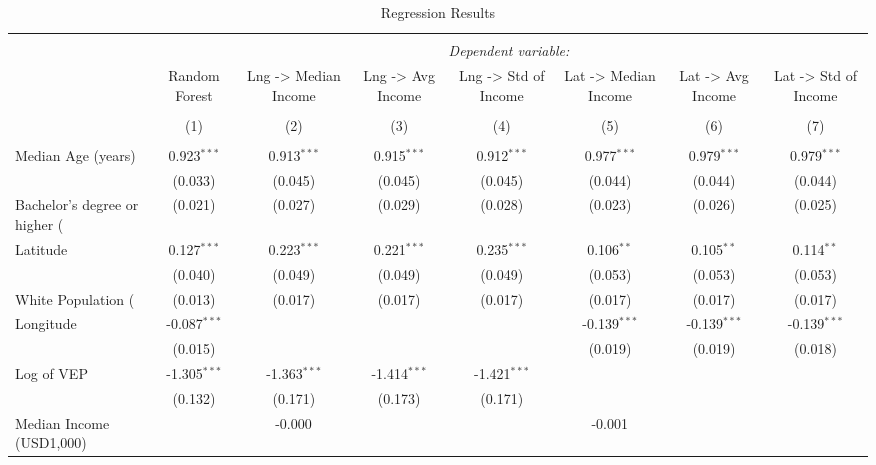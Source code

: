 \begin{table}[!htbp] \centering
  \caption{Regression Results}
\begin{tabular}{@{\extracolsep{5pt}}lccccccc}
\\[-1.8ex]\hline
\hline \\[-1.8ex]
& \multicolumn{7}{c}{\textit{Dependent variable:}} \
\cr \cline{7-8}
\\[-1.8ex] & \multicolumn{1}{c}{Random Forest} & \multicolumn{1}{c}{Lng -> Median Income} & \multicolumn{1}{c}{Lng -> Avg Income} & \multicolumn{1}{c}{Lng -> Std of Income} & \multicolumn{1}{c}{Lat -> Median Income} & \multicolumn{1}{c}{Lat -> Avg Income} & \multicolumn{1}{c}{Lat -> Std of Income}  \\
\\[-1.8ex] & (1) & (2) & (3) & (4) & (5) & (6) & (7) \\
\hline \\[-1.8ex]
 Median Age (years) & 0.923$^{***}$ & 0.913$^{***}$ & 0.915$^{***}$ & 0.912$^{***}$ & 0.977$^{***}$ & 0.979$^{***}$ & 0.979$^{***}$ \\
  & (0.033) & (0.045) & (0.045) & (0.045) & (0.044) & (0.044) & (0.044) \\
 Bachelor's degree or higher (%
  & (0.021) & (0.027) & (0.029) & (0.028) & (0.023) & (0.026) & (0.025) \\
 Latitude & 0.127$^{***}$ & 0.223$^{***}$ & 0.221$^{***}$ & 0.235$^{***}$ & 0.106$^{**}$ & 0.105$^{**}$ & 0.114$^{**}$ \\
  & (0.040) & (0.049) & (0.049) & (0.049) & (0.053) & (0.053) & (0.053) \\
 White Population (%
  & (0.013) & (0.017) & (0.017) & (0.017) & (0.017) & (0.017) & (0.017) \\
 Longitude & -0.087$^{***}$ & & & & -0.139$^{***}$ & -0.139$^{***}$ & -0.139$^{***}$ \\
  & (0.015) & & & & (0.019) & (0.019) & (0.018) \\
 Log of VEP & -1.305$^{***}$ & -1.363$^{***}$ & -1.414$^{***}$ & -1.421$^{***}$ & & & \\
  & (0.132) & (0.171) & (0.173) & (0.171) & & & \\
 Median Income (USD1,000) & & -0.000$^{}$ & & & -0.001$^{}$ & & \\

\end{tabular}
\end{table}
